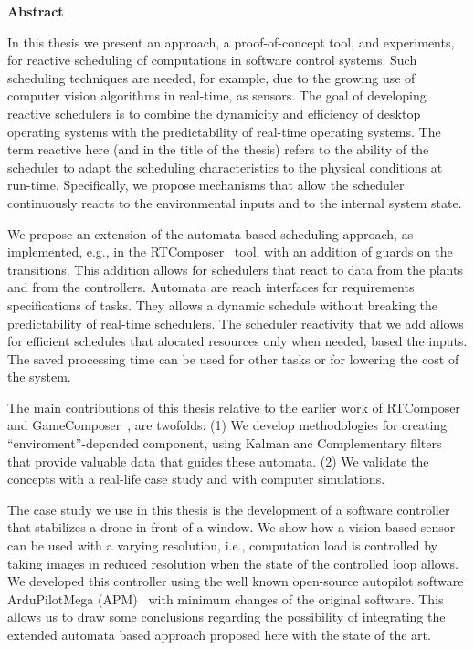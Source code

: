 \documentclass[../hodai_thesis.tex]{subfiles}
\begin{document}
\begin{center}
\LARGE \textbf{Abstract}
\end{center}

In this thesis we present an approach, a proof-of-concept tool, and experiments, for reactive scheduling of computations in software control systems. 
Such scheduling techniques are needed, for example, due to the growing use of computer vision algorithms in real-time, as sensors.
The goal of developing reactive schedulers is to combine the dynamicity and efficiency of desktop operating systems with the predictability of real-time operating systems.
The term reactive here (and in the title of the thesis) refers to the ability of the scheduler to adapt the scheduling characteristics to the physical conditions at run-time. 
Specifically, we propose mechanisms that allow the scheduler continuously reacts to the environmental inputs and to the internal system state. 

We propose an extension of the automata based scheduling approach, as implemented, e.g., in the RTComposer~\cite{RTComposer} tool, with an addition of guards on the
transitions. This addition allows for schedulers that react to data from the plants and from the controllers. Automata are reach interfaces for requirements specifications of tasks. They
allows a dynamic schedule without breaking the predictability of real-time schedulers. The scheduler reactivity that we add allows for efficient schedules that 
alocated resources only when needed, based the inputs. The saved processing time can be used for other tasks or for lowering the cost of the system.

The main contributions of this thesis relative to the earlier work of RTComposer~\cite{RTComposer} and GameComposer~\cite{Merav}, are twofolds: (1) We develop methodologies for
creating ``enviroment''-depended component, using Kalman anc Complementary filters that provide valuable data that guides these automata. (2) We validate the concepts with a real-life 
case study and with computer simulations.

The case study we use in this thesis is the development of a software controller that stabilizes a drone in front of a window. We show how a vision based sensor can be used with a varying resolution, i.e.,
computation load is controlled by taking images in reduced resolution when the state of the controlled loop allows. We developed this controller using the well known 
open-source autopilot software ArduPilotMega (APM)~\cite{APM} with minimum changes of the original software. This allows us to draw some conclusions regarding the possibility of integrating the extended 
automata based approach proposed here with the state of the art.
\end{document}
